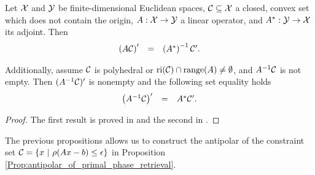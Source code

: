 \begin{prop}		\label{Prop:antipolar_set_equalities}
Let ${\mathcal X}$ and ${\mathcal Y}$ be finite-dimensional Euclidean spaces, ${\mathcal C} \subseteq {\mathcal X}$ a closed, convex set which does not contain the origin, $A : {\mathcal X} \rightarrow {\mathcal Y}$ a linear operator, and $A^* : {\mathcal Y} \rightarrow {\mathcal X}$ its adjoint.
Then
\begin{equation}		\label{Eqn:antipolar_set_equalities_1}
\begin{array}{rll}
\left( A {\mathcal C} \right)' & = & 	\left( A^* \right)^{-1} {\mathcal C}' .
\end{array}
\end{equation}

Additionally, assume ${\mathcal C}$ is polyhedral or $\textnormal{ri}({\mathcal C}) \cap \textnormal{range}(A) \neq \emptyset$, and $A^{-1}{\mathcal C}$ is not empty.  
Then $( A^{-1} {\mathcal C})'$ is nonempty and the following set equality holds
\begin{equation}		\label{Eqn:antipolar_set_equalities_2}
\begin{array}{rll}
\left( A^{-1} {\mathcal C} \right)' & = &  A^* {\mathcal C}' .
\end{array}
\end{equation}
\end{prop}
\begin{proof}
The first result is proved in \cite[Proposition 3.3]{DBLP:journals/siamjo/FriedlanderMP14} and the second in \cite[Proposition 3.4, 3.5]{DBLP:journals/siamjo/FriedlanderMP14}.
\end{proof}


The previous propositions allows us to construct the antipolar of the constraint set ${\mathcal C} = \{ x \ | \ \rho(Ax-b) \leq \epsilon \}$ in Proposition \ref{Prop:antipolar_of_primal_phase_retrieval}.

